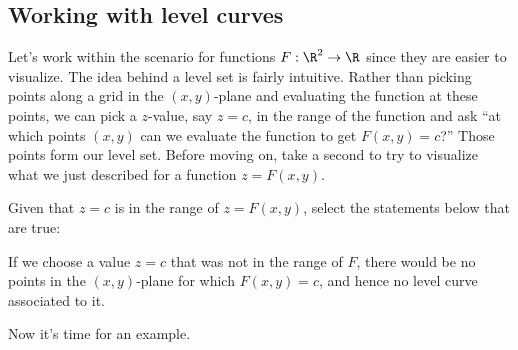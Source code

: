 \documentclass{ximera}
\begin{document}
\subsection{Working with level curves}

Let's work within the scenario for functions $F:\R^2 \to \R$ since
they are easier to visualize.  The idea behind a level set is fairly
intuitive.  Rather than picking points along a grid in the
$(x,y)$-plane and evaluating the function at these points, we can pick
a $z$-value, say $z=c$, in the range of the function and ask ``at
which points $(x,y)$ can we evaluate the function to get $F(x,y)=c$?''
Those points form our level set.  Before moving on, take a second to
try to visualize what we just described for a function $z=F(x,y)$.
\begin{example}
  Given that $z=c$ is in the range of $z=F(x,y)$, select the
  statements below that are true:
  \begin{selectAll}
  \end{selectAll}
\end{example}


\begin{remark}
  If we choose a value $z=c$ that was not in the range of $F$, there
  would be no points in the $(x,y)$-plane for which $F(x,y)=c$, and
  hence no level curve associated to it.
\end{remark}



Now it's time for an example.
\end{document}
